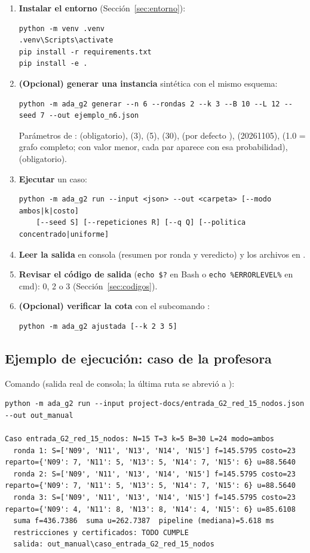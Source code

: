 \documentclass[11pt,a4paper]{article}
\begin{document}
\begin{enumerate}[leftmargin=*]
\item \textbf{Instalar el entorno} (Sección~\ref{sec:entorno}):
\begin{lstlisting}
python -m venv .venv
.venv\Scripts\activate
pip install -r requirements.txt
pip install -e .
\end{lstlisting}
\item \textbf{(Opcional) generar una instancia} sintética con el mismo esquema:
\begin{lstlisting}
python -m ada_g2 generar --n 6 --rondas 2 --k 3 --B 10 --L 12 --seed 7 --out ejemplo_n6.json
\end{lstlisting}
Parámetros de :  (obligatorio),  (3),  (5),  (30),  (por defecto ),  (20261105),  (1.0 = grafo completo; con valor menor, cada par aparece con esa probabilidad),  (obligatorio).
\item \textbf{Ejecutar} un caso:
\begin{lstlisting}
python -m ada_g2 run --input <json> --out <carpeta> [--modo ambos|k|costo]
    [--seed S] [--repeticiones R] [--q Q] [--politica concentrado|uniforme]
\end{lstlisting}
\item \textbf{Leer la salida} en consola (resumen por ronda y veredicto) y los archivos en .
\item \textbf{Revisar el código de salida} (\texttt{echo \$?} en Bash o \texttt{echo \%ERRORLEVEL\%} en cmd): 0, 2 o 3 (Sección~\ref{sec:codigos}).
\item \textbf{(Opcional) verificar la cota} con el subcomando :
\begin{lstlisting}
python -m ada_g2 ajustada [--k 2 3 5]
\end{lstlisting}
\end{enumerate}

\subsection{Ejemplo de ejecución: caso de la profesora}

Comando (salida real de consola; la última ruta se abrevió a ):

\begin{lstlisting}
python -m ada_g2 run --input project-docs/entrada_G2_red_15_nodos.json --out out_manual

Caso entrada_G2_red_15_nodos: N=15 T=3 k=5 B=30 L=24 modo=ambos
  ronda 1: S=['N09', 'N11', 'N13', 'N14', 'N15'] f=145.5795 costo=23 reparto={'N09': 7, 'N11': 5, 'N13': 5, 'N14': 7, 'N15': 6} u=88.5640
  ronda 2: S=['N09', 'N11', 'N13', 'N14', 'N15'] f=145.5795 costo=23 reparto={'N09': 7, 'N11': 5, 'N13': 5, 'N14': 7, 'N15': 6} u=88.5640
  ronda 3: S=['N09', 'N11', 'N13', 'N14', 'N15'] f=145.5795 costo=23 reparto={'N09': 4, 'N11': 8, 'N13': 8, 'N14': 4, 'N15': 6} u=85.6108
  suma f=436.7386  suma u=262.7387  pipeline (mediana)=5.618 ms
  restricciones y certificados: TODO CUMPLE
  salida: out_manual\caso_entrada_G2_red_15_nodos
\end{lstlisting}
\end{document}
